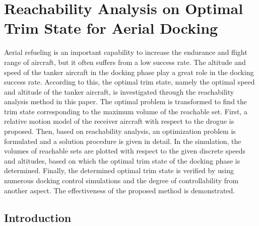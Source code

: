 
\chapter{Reachability Analysis on Optimal Trim State for Aerial Docking}


Aerial refueling is an important capability to increase the endurance and flight range of aircraft, but it often suffers from a low success rate. The altitude and speed of the tanker aircraft in the docking phase play a great role in the docking success rate. According to this, the optimal trim state, namely the optimal speed and altitude of the tanker aircraft, is investigated through the reachability analysis method in this paper. The optimal problem is transformed to find the trim state corresponding to the maximum volume of the reachable set. First, a relative motion model of the receiver aircraft with respect to the drogue is proposed. Then, based on reachability analysis, an optimization problem is formulated and a solution procedure is given in detail. In the simulation, the volumes of reachable sets are plotted with respect to the given discrete speeds and altitudes, based on which the optimal trim state of the docking phase is determined. Finally, the determined optimal trim state is verified by using numerous docking control simulations and the degree of controllability from another aspect. The effectiveness of the proposed method is demonstrated.


\section{Introduction}



